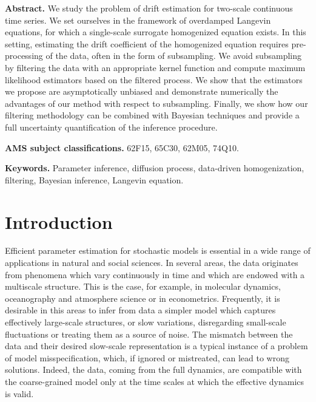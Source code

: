\documentclass[10pt]{article}
\begin{document}
\maketitle	

\textbf{Abstract.} We study the problem of drift estimation for two-scale continuous time series. We set ourselves in the framework of overdamped Langevin equations, for which a single-scale surrogate homogenized equation exists. In this setting, estimating the drift coefficient of the homogenized equation requires pre-processing of the data, often in the form of subsampling. We avoid subsampling by filtering the data with an appropriate kernel function and compute maximum likelihood estimators based on the filtered process. We show that the estimators we propose are asymptotically unbiased and demonstrate numerically the advantages of our method with respect to subsampling. Finally, we show how our filtering methodology can be combined with Bayesian techniques and provide a full uncertainty quantification of the inference procedure.
 
\textbf{AMS subject classifications.} 62F15, 65C30, 62M05, 74Q10.

\textbf{Keywords.} Parameter inference, diffusion process, data-driven homogenization, filtering, Bayesian inference, Langevin equation.

\section{Introduction}

Efficient parameter estimation for stochastic models is essential in a wide range of applications in natural and social sciences. In several areas, the data originates from phenomena which vary continuously in time and which are endowed with a multiscale structure. This is the case, for example, in molecular dynamics, oceanography and atmosphere science or in econometrics. Frequently, it is desirable in this areas to infer from data a simpler model which captures effectively large-scale structures, or slow variations, disregarding small-scale fluctuations or treating them as a source of noise. The mismatch between the data and their desired slow-scale representation is a typical instance of a problem of model misspecification, which, if ignored or mistreated, can lead to wrong solutions. Indeed, the data, coming from the full dynamics, are compatible with the coarse-grained model only at the time scales at which the effective dynamics is valid.
\end{document}
